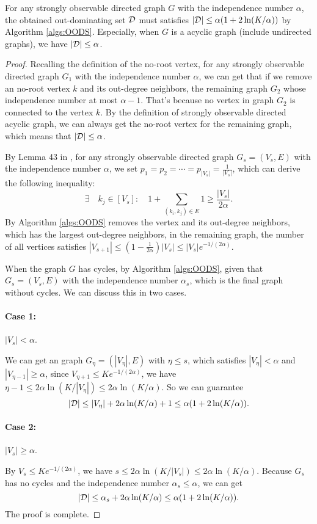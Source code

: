 \begin{lemma}
\label{lem:sdsog}    %
    For any strongly observable directed graph $G$ with the independence number $\alpha$, the obtained out-dominating set ${\mathcal{D}}$ must satisfies $|{\mathcal{D}}| \leq \alpha(1 + 2\ln(K/\alpha))$ by Algorithm \ref{algs:OODS}. Especially, when $G$ is a acyclic graph (include undirected graphs), we have $|{\mathcal{D}}| \leq \alpha$.
\end{lemma}
\begin{proof}
    Recalling the definition of the no-root vertex, for any strongly observable directed graph $G_1$ with the independence number $\alpha$, we can get that if we remove an no-root vertex $k$ and its out-degree neighbors, the remaining graph $G_2$ whose independence number at most $\alpha - 1$. That's because no vertex in graph $G_2$ is connected to the vertex $k$. By the definition of strongly observable directed acyclic graph, we can always get the no-root vertex for the remaining graph, which means that $|{\mathcal{D}}| \leq \alpha$.

    By Lemma 43 in \cite{dann2023blackbox}, for any strongly observable directed graph $G_s = (V_s,E)$ with the independence number $\alpha$, we set $p_1 = p_2 = \cdots = p_{|V_s|} = \frac{1}{|V_s|}$, which can derive the following inequality:
    \[\exists \quad k_j \in [V_s]: \quad 1 + \sum_{(k_i,k_j) \in E} 1 \geq \frac{|V_s|}{2\alpha}.\]
    By Algorithm \ref{algs:OODS} removes the vertex and its out-degree neighbors, which has the largest out-degree neighbors, in the remaining graph, the number of all vertices satisfies $|V_{s+1}| \leq (1-\frac{1}{2\alpha})|V_s| \leq |V_s| e^{-1/(2\alpha)}$.
    
    When the graph $G$ has cycles, by Algorithm \ref{algs:OODS}, given that $G_s = (V_s,E)$ with the independence number $\alpha_s$, which is the final graph without cycles. We can discuss this in two cases.

    \paragraph{Case 1:} $|V_s| < \alpha$.

    We can get an graph $G_{\eta} = (|V_{\eta}|,E)$ with $\eta \leq s$, which satisfies $|V_{\eta}| < \alpha$ and $|V_{\eta - 1}| \geq \alpha$, since $V_{\eta + 1} \leq K e^{-1/(2\alpha)}$, we have $\eta - 1 \leq 2\alpha \ln(K/|V_{\eta}|) \leq 2\alpha \ln(K/\alpha)$. So we can guarantee 
    \[|{\mathcal{D}}| \leq |V_{\eta}| + 2\alpha \ln(K/\alpha) + 1 \leq \alpha(1 + 2\ln(K/\alpha)).\]

    \paragraph{Case 2:} $|V_s| \geq \alpha$.
    
    By $V_{s} \leq K e^{-1/(2\alpha)}$, we have $s \leq 2\alpha \ln(K/|V_{s}|) \leq 2\alpha \ln(K/\alpha)$. Because $G_s$ has no cycles and the independence number $\alpha_s \leq \alpha$, we can get
    \[|{\mathcal{D}}| \leq \alpha_s + 2\alpha \ln(K/\alpha) \leq \alpha(1 + 2\ln(K/\alpha)).\] 
    The proof is complete.
\end{proof}

